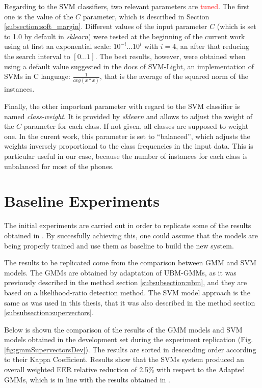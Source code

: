 Regarding to the SVM classifiers, two relevant parameters are \textcolor{red}{tuned}.
The first one is
the value of the $C$ parameter, which is described in Section
\ref{subsection:soft_margin}.
Different values of the input parameter $C$ (which is set to 1.0 by default
in \textit{sklearn})
were tested at the beginning of the
current work using at first an exponential scale:
$10^{-i} \ldots 10^{i}$ with $i=4$, an after that reducing the search interval to
$[0 \ldots 1]$. The best results, however, were obtained when using a default value
suggested in the docs of SVM-Light, an implementation of SVMs in C language: $\frac{1}{avg(x*x)}$,
that is the average of the squared norm of the instances.

Finally, the other important parameter with regard to the SVM classifier is named
\textit{class-weight}. It is provided by \textit{sklearn} and allows to
adjust the weight of the $C$ parameter for each class. If not given, all classes are supposed
to weight one. In the curent work, this parameter is set to ``balanced'', which adjusts
the weights inversely proportional to the class frequencies in the input data.
This is particular useful in our case, because the number of instances for each class is
unbalanced for most of the phones.

\section{Baseline Experiments}

The initial experiments are carried out in order to replicate some of
the results obtained in \cite{main}.
By succesfully achieving this, one could assume that the models are being properly trained
and use them as baseline to build the new system.

The results to be replicated come from the comparison between GMM and SVM models.
The GMMs are obtained by adaptation of UBM-GMMs, as it was previously described in
the method section \ref{subsubsection:ubm}, and they are based on
a likelihood-ratio detection method.
The SVM model approach is the same as was used in this thesis, that it was also described
in the method section \ref{subsubsection:supervectors}.

Below is shown the
comparison of the results of the GMM models and
SVM models obtained in the development set during the experiment
replication (Fig. \ref{fig:gmmSupervectorsDev}).
The results are sorted in descending order according to their Kappa Coefficient.
Results show that the SVMs system produced an overall weighted EER relative reduction of 2.5\% with
respect to the Adapted GMMs, which is in line with the results obtained
in \cite{main}.

